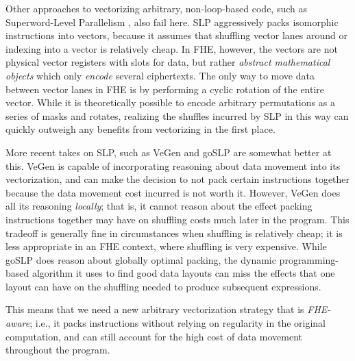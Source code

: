 
Other approaches to vectorizing arbitrary, non-loop-based code, such as Superword-Level Parallelism \cite{SLP}, also fail here.
SLP aggressively packs isomorphic instructions into vectors, because it assumes that shuffling vector lanes around or indexing into a vector is relatively cheap.
In FHE, however, the vectors are not physical vector registers with slots for data, but rather {\em abstract mathematical objects} which only {\em encode} several ciphertexts.
The only way to move data between vector lanes in FHE is by performing a cyclic rotation of the entire vector.
While it is theoretically possible to encode arbitrary permutations as a series of masks and rotates, realizing the shuffles incurred by SLP in this way can quickly outweigh any benefits from vectorizing in the first place.

More recent takes on SLP, such as VeGen \cite{VeGen} and goSLP \cite{goSLP} are somewhat better at this.
VeGen is capable of incorporating reasoning about data movement into its vectorization, and can make the decision to not pack certain instructions together because the data movement cost incurred is not worth it.
However, VeGen does all its reasoning {\em locally}; that is, it cannot reason about the effect packing instructions together may have on shuffling costs much later in the program. This tradeoff is generally fine in circumstances when shuffling is relatively cheap; it is less appropriate in an FHE context, where shuffling is very expensive.
While goSLP does reason about globally optimal packing, the dynamic programming-based algorithm it uses to find good data layouts can miss the effects that one layout can have on the shuffling needed to produce subsequent expressions. %

This means that we need a new arbitrary vectorization strategy that is {\em FHE-aware}; i.e., it packs instructions without relying on regularity in the original computation, and can still account for the high cost of data movement throughout the program.


